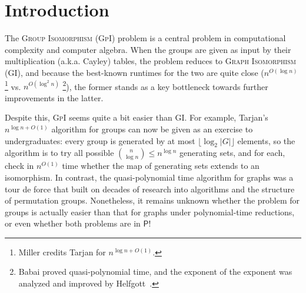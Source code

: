 \documentclass{article}
\newcommand{\algprobm}[1]{\textsc{#1}\xspace}
\newcommand*{\ComplexityClass}[1]{\ensuremath{\mathsf{#1}}\xspace}
\newcommand*{\NP}{\ComplexityClass{NP}}
\renewcommand{\P}{\ComplexityClass{P}}
\begin{document}
\begin{abstract}
\begin{itemize}
\item  As a strong contrast, we show that MGS for arbitrary magmas is \NP-complete.
\end{itemize}

Our results suggest that understanding the constant-depth circuit complexity may be key to resolving the complexity of problems concerning (quasi)groups in the multiplication table model.
\end{abstract}



\setcounter{page}{1}

\section{Introduction}
The \algprobm{Group Isomorphism} (\algprobm{GpI}) problem is a central problem in computational complexity and computer algebra. When the groups are given as input by their multiplication (a.k.a. Cayley) tables, the problem reduces to \algprobm{Graph Isomorphism} (\algprobm{GI}), and because the best-known runtimes for the two are quite close ($n^{O(\log n)}$ \cite{MillerTarjan}\footnote{Miller \cite{MillerTarjan} credits Tarjan for $n^{\log n + O(1)}$.} vs. $n^{O(\log^2 n)}$ \cite{BabaiGraphIso}\footnote{Babai \cite{BabaiGraphIso} proved quasi-polynomial time, and the exponent of the exponent was analyzed and improved by Helfgott~\cite{HelgottGIAnalysis}.}), the former stands as a key bottleneck towards further improvements in the latter. 

Despite this, \algprobm{GpI} seems quite a bit easier than \algprobm{GI}. For example, Tarjan's $n^{\log n + O(1)}$ algorithm for groups \cite{MillerTarjan} can now be given as an exercise to undergraduates: every group is generated by at most $\lfloor \log_2 |G| \rfloor$ elements, so the algorithm is to try all possible $\binom{n}{\log n} \leq n^{\log n}$ generating sets, and for each, check in $n^{O(1)}$ time whether the map of generating sets extends to an isomorphism. In contrast, the quasi-polynomial time algorithm for graphs was a tour de force that built on decades of research into algorithms and the structure of permutation groups. Nonetheless, it remains unknown whether the problem for groups is actually easier than that for graphs under polynomial-time reductions, or even whether both problems are in $\P$!
\end{document}
